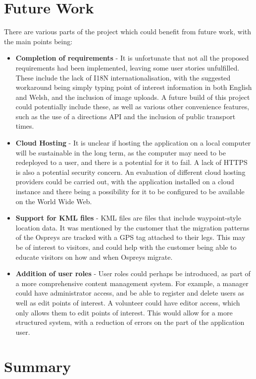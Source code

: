 \section{Future Work}

There are various parts of the project which could benefit from future work, with the main points being:

\begin{itemize}
	\item \textbf{Completion of requirements} - It is unfortunate that not all the proposed requirements had been implemented, leaving some user stories unfulfilled. These include the lack of I18N internationalisation, with the suggested workaround being simply typing point of interest information in both English and Welsh, and the inclusion of image uploads. A future build of this project could potentially include these, as well as various other convenience features, such as the use of a directions API and the inclusion of public transport times.
	\item \textbf{Cloud Hosting} - It is unclear if hosting the application on a local computer will be sustainable in the long term, as the computer may need to be redeployed to a user, and there is a potential for it to fail. A lack of HTTPS is also a potential security concern. An evaluation of different cloud hosting providers could be carried out, with the application installed on a cloud instance and there being a possibility for it to be configured to be available on the World Wide Web.
	\item \textbf{Support for KML files} - KML files are files that include waypoint-style location data. It was mentioned by the customer that the migration patterns of the Ospreys are tracked with a GPS tag attached to their legs. This may be of interest to visitors, and could help with the customer being able to educate visitors on how and when Ospreys migrate.
	\item \textbf{Addition of user roles} - User roles could perhaps be introduced, as part of a more comprehensive content management system. For example, a manager could have administrator access, and be able to register and delete users as well as edit points of interest. A volunteer could have editor access, which only allows them to edit points of interest. This would allow for a more structured system, with a reduction of errors on the part of the application user.
\end{itemize}

\section{Summary}


